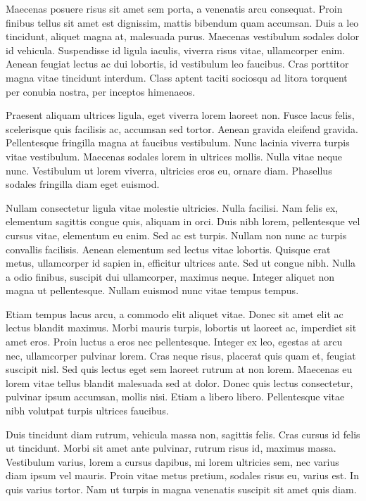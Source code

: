 \documentclass[aps,11pt, twocolumn]{revtex4-1}
\begin{document}
Maecenas posuere risus sit amet sem porta, a venenatis arcu consequat. Proin finibus tellus sit amet est dignissim, mattis bibendum quam accumsan. Duis a leo tincidunt, aliquet magna at, malesuada purus. Maecenas vestibulum sodales dolor id vehicula. Suspendisse id ligula iaculis, viverra risus vitae, ullamcorper enim. Aenean feugiat lectus ac dui lobortis, id vestibulum leo faucibus. Cras porttitor magna vitae tincidunt interdum. Class aptent taciti sociosqu ad litora torquent per conubia nostra, per inceptos himenaeos.

Praesent aliquam ultrices ligula, eget viverra lorem laoreet non. Fusce lacus felis, scelerisque quis facilisis ac, accumsan sed tortor. Aenean gravida eleifend gravida. Pellentesque fringilla magna at faucibus vestibulum. Nunc lacinia viverra turpis vitae vestibulum. Maecenas sodales lorem in ultrices mollis. Nulla vitae neque nunc. Vestibulum ut lorem viverra, ultricies eros eu, ornare diam. Phasellus sodales fringilla diam eget euismod.

Nullam consectetur ligula vitae molestie ultricies. Nulla facilisi. Nam felis ex, elementum sagittis congue quis, aliquam in orci. Duis nibh lorem, pellentesque vel cursus vitae, elementum eu enim. Sed ac est turpis. Nullam non nunc ac turpis convallis facilisis. Aenean elementum sed lectus vitae lobortis. Quisque erat metus, ullamcorper id sapien in, efficitur ultrices ante. Sed ut congue nibh. Nulla a odio finibus, suscipit dui ullamcorper, maximus neque. Integer aliquet non magna ut pellentesque. Nullam euismod nunc vitae tempus tempus.

Etiam tempus lacus arcu, a commodo elit aliquet vitae. Donec sit amet elit ac lectus blandit maximus. Morbi mauris turpis, lobortis ut laoreet ac, imperdiet sit amet eros. Proin luctus a eros nec pellentesque. Integer ex leo, egestas at arcu nec, ullamcorper pulvinar lorem. Cras neque risus, placerat quis quam et, feugiat suscipit nisl. Sed quis lectus eget sem laoreet rutrum at non lorem. Maecenas eu lorem vitae tellus blandit malesuada sed at dolor. Donec quis lectus consectetur, pulvinar ipsum accumsan, mollis nisi. Etiam a libero libero. Pellentesque vitae nibh volutpat turpis ultrices faucibus.

Duis tincidunt diam rutrum, vehicula massa non, sagittis felis. Cras cursus id felis ut tincidunt. Morbi sit amet ante pulvinar, rutrum risus id, maximus massa. Vestibulum varius, lorem a cursus dapibus, mi lorem ultricies sem, nec varius diam ipsum vel mauris. Proin vitae metus pretium, sodales risus eu, varius est. In quis varius tortor. Nam ut turpis in magna venenatis suscipit sit amet quis diam.
\end{document}
